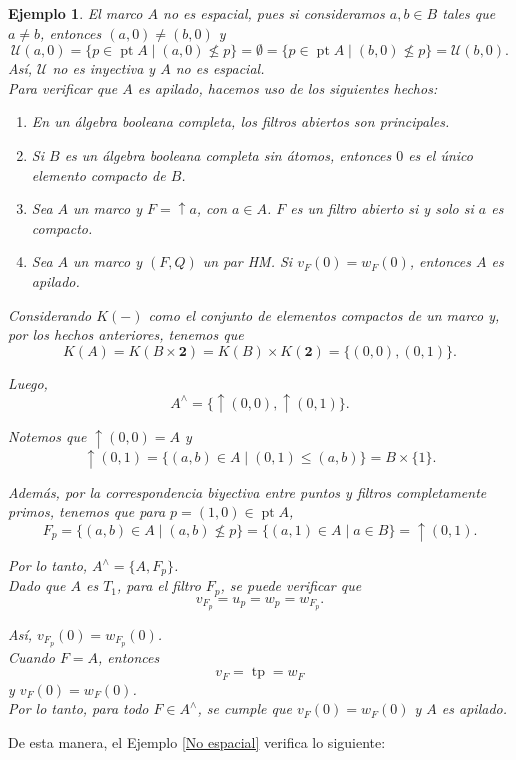\documentclass[12pt]{article}
\newtheorem{ej}[thm]{Ejemplo}
\DeclareMathOperator{\pt}{pt}
\DeclareMathOperator{\tp}{tp}
\begin{document}
\begin{ej}
El marco $A$ no es espacial, pues si consideramos $a, b\in B$ tales que $a\neq b$, entonces $(a, 0)\neq (b, 0)$ y
\[
\mathcal{U}(a,0)=\{p\in \pt A\mid (a,0)\nleq p\}=\emptyset=\{p\in \pt A\mid (b,0)\nleq p\}=\mathcal{U}(b,0). 
\]
Así, $\mathcal{U}$ no es inyectiva y $A$ no es espacial.\\

Para verificar que $A$ es apilado, hacemos uso de los siguientes hechos:
\begin{enumerate}
    \item En un álgebra booleana completa, los filtros abiertos son principales.
    \item Si $B$ es un álgebra booleana completa sin átomos, entonces $0$ es el único elemento compacto de $B$.
    \item Sea $A$ un marco y $F=\uparrow a$, con $a\in A$. $F$ es un filtro abierto si y solo si $a$ es compacto.
    \item Sea $A$ un marco y $(F, Q)$ un par HM. Si $v_F(0)=w_F(0)$, entonces $A$ es apilado.
\end{enumerate}

Considerando $K(-)$ como el conjunto de elementos compactos de un marco y, por los hechos anteriores, tenemos que
\[
K(A)=K(B\times \mathbf{2})=K(B)\times K(\mathbf{2})=\{(0,0),(0,1)\}.
\]

Luego,
\[
A^\wedge=\{\uparrow (0,0), \uparrow (0,1)\}.
\]

Notemos que $\uparrow (0,0)=A$ y 
\[
\uparrow (0,1)=\{(a,b)\in A\mid (0,1)\leq (a,b)\}=B\times \{1\}.
\]

Además, por la correspondencia biyectiva entre puntos y filtros completamente primos, tenemos que para $p=(1,0)\in \pt A$,
\[
F_p=\{(a,b)\in A\mid (a,b)\nleq p\}=\{(a,1)\in A\mid a\in B\}=\uparrow (0,1).
\]

Por lo tanto, $A^\wedge =\{A, F_p\}$.\\

Dado que $A$ es $T_1$, para el filtro $F_p$, se puede verificar que 
\[
v_{F_p}=u_p=w_p=w_{F_p}.
\]

Así, $v_{F_p}(0)=w_{F_p}(0)$.\\

Cuando $F=A$, entonces 
\[
v_F=\tp=w_F
\]
y $v_F(0)=w_F(0)$.\\

Por lo tanto, para todo $F\in A^\wedge$, se cumple que $v_F(0)=w_F(0)$ y $A$ es apilado.
\end{ej}

De esta manera, el Ejemplo \ref{No espacial} verifica lo siguiente:
\end{document}
